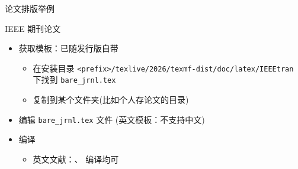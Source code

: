 \begin{frame}[fragile]{论文排版举例}
  \begin{block}{IEEE 期刊论文}
    \begin{itemize}
      \item 获取模板：已随发行版自带
            \begin{itemize}
              \item 在安装目录 \verb|<prefix>/texlive/2026/texmf-dist/doc/latex/IEEEtran|
                    下找到 \verb|bare_jrnl.tex|
              \item 复制到某个文件夹(比如个人存论文的目录)
            \end{itemize}
      \item 编辑 \verb|bare_jrnl.tex| 文件 (英文模板：不支持中文)
      \item 编译
            \begin{itemize}
              \item 英文文献：\XeLaTeX{}、\pdfLaTeX{} 编译均可
            \end{itemize}
    \end{itemize}
  \end{block}
\end{frame}
